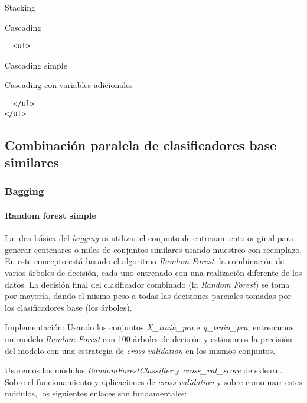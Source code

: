 \documentclass[11pt]{article}
\begin{document}
Stacking

Cascading

\begin{verbatim}
  <ul>
\end{verbatim}

Cascading simple

Cascading con variables adicionales

\begin{verbatim}
  </ul>
</ul>
\end{verbatim}

    \hypertarget{combinaciuxf3n-paralela-de-clasificadores-base-similares}{%
\subsection{Combinación paralela de clasificadores base
similares}\label{combinaciuxf3n-paralela-de-clasificadores-base-similares}}

    \hypertarget{bagging}{%
\subsubsection{Bagging}\label{bagging}}

    \hypertarget{random-forest-simple}{%
\paragraph{Random forest simple}\label{random-forest-simple}}

    La idea básica del \emph{bagging} es utilizar el conjunto de
entrenamiento original para generar centenares o miles de conjuntos
similares usando muestreo con reemplazo. En este concepto está basado el
algoritmo \emph{Random Forest}, la combinación de varios árboles de
decisión, cada uno entrenado con una realización diferente de los datos.
La decisión final del clasificador combinado (la \emph{Random Forest})
se toma por mayoría, dando el mismo peso a todas las decisiones
parciales tomadas por los clasificadores base (los árboles).

    Implementación: Usando los conjuntos \emph{X\_train\_pca} e
\emph{y\_train\_pca}, entrenamos un modelo \emph{Random Forest} con 100
árboles de decisión y estimamos la precisión del modelo con una
estrategia de \emph{cross-validation} en los mismos conjuntos.

Usaremos los módulos \emph{RandomForestClassifier} y
\emph{cross\_val\_score} de sklearn. Sobre el funcionamiento y
aplicaciones de \emph{cross validation} y sobre como usar estes módulos,
los siguientes enlaces son fundamentales:
\end{document}
